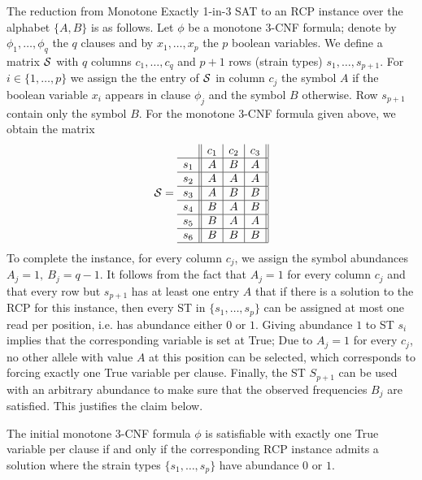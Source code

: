 \documentclass[10pt]{llncs}
\begin{document}
The reduction from Monotone Exactly 1-in-3 SAT to an RCP instance over the alphabet $\{A,B\}$ is as follows. Let $\phi$ be a monotone 3-CNF formula; denote by $\phi_1,\dots, \phi_q$ the $q$ clauses and by $x_1,\dots,x_p$ the $p$ boolean variables. We define a matrix $\cal S$ with $q$ columns $c_1,\dots,c_q$ and $p+1$ rows (strain types) $s_1,\dots,s_{p+1}$. For $i \in \{1,\dots,p\}$ we assign the the entry of $\cal S$ in column $c_j$ the symbol $A$ if the boolean variable $x_i$ appears in clause $\phi_j$ and the symbol $B$ otherwise. Row $s_{p+1}$ contain only the symbol $B$. For the monotone 3-CNF formula given above, we obtain the matrix
$${\cal S} = 
    \begin{array}{c||c|c|c||}
        & c_1 & c_2 & c_3 \\ \hline
    s_1 & A   & B   & A   \\ \hline
    s_2 & A   & A   & A   \\ \hline
    s_3 & A   & B   & B   \\ \hline
    s_4 & B   & A   & B   \\ \hline
    s_5 & B   & A   & A   \\ \hline
    s_6 & B   & B   & B   \\ \hline
    \end{array}
$$
To complete the instance, for every column $c_j$, we assign the symbol abundances $A_j=1,\ B_j=q-1$. It follows from the fact that $A_j=1$ for every column $c_j$ and that every row but $s_{p+1}$ has at least one entry $A$ that if there is a solution to the RCP for this instance, then every ST in $\{s_1,\dots,s_p\}$ can be assigned at most one read per position, i.e. has abundance either $0$ or $1$. Giving abundance $1$ to ST $s_i$ implies that the corresponding variable is set at True; Due to $A_j=1$ for every $c_j$, no other allele with value $A$ at this position can be selected, which corresponds to forcing exactly one True variable per clause. Finally, the ST $S_{p+1}$ can be used with an arbitrary abundance to make sure that the observed frequencies $B_j$ are satisfied. This justifies the claim below.

\begin{claim}
    \label{claim:RCPhardness}
    The initial monotone 3-CNF formula $\phi$ is satisfiable with exactly one True variable per clause if and only if the corresponding RCP instance admits a solution where the strain types $\{s_1,\dots,s_p\}$  have abundance $0$ or $1$.
\end{claim}
\end{document}
